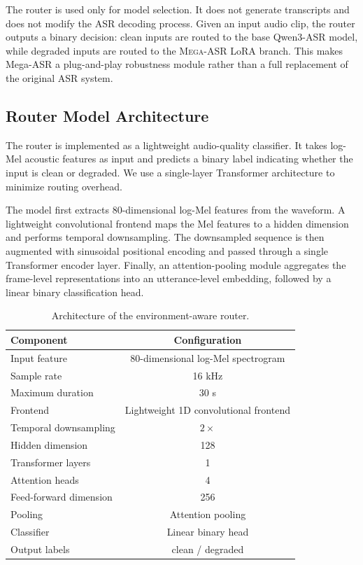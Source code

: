\documentclass{article}
\begin{document}
The router is used only for model selection. It does not generate transcripts
and does not modify the ASR decoding process. Given an input audio clip, the
router outputs a binary decision: clean inputs are routed to the base Qwen3-ASR
model, while degraded inputs are routed to the \textsc{Mega-ASR} LoRA branch. This makes
Mega-ASR a plug-and-play robustness module rather than a full replacement of the
original ASR system.



\subsection{Router Model Architecture}

The router is implemented as a lightweight audio-quality classifier. It takes
log-Mel acoustic features as input and predicts a binary label indicating
whether the input is clean or degraded. We use a single-layer Transformer
architecture to minimize routing overhead.

The model first extracts 80-dimensional log-Mel features from the waveform. A
lightweight convolutional frontend maps the Mel features to a hidden dimension
and performs temporal downsampling. The downsampled sequence is then augmented
with sinusoidal positional encoding and passed through a single Transformer
encoder layer. Finally, an attention-pooling module aggregates the frame-level
representations into an utterance-level embedding, followed by a linear binary
classification head.

\begin{table}[t]
\centering
\small
\caption{Architecture of the environment-aware router.}
\label{tab:router_architecture}
\begin{tabular}{lc}
\toprule
\textbf{Component} & \textbf{Configuration} \\
\midrule
Input feature & 80-dimensional log-Mel spectrogram \\
Sample rate & 16 kHz \\
Maximum duration & 30 s \\
Frontend & Lightweight 1D convolutional frontend \\
Temporal downsampling & $2\times$ \\
Hidden dimension & 128 \\
Transformer layers & 1 \\
Attention heads & 4 \\
Feed-forward dimension & 256 \\
Pooling & Attention pooling \\
Classifier & Linear binary head \\
Output labels & clean / degraded \\
\bottomrule
\end{tabular}
\end{table}
\end{document}
